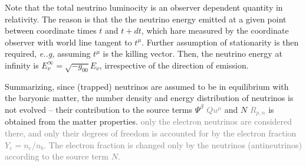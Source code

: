 \documentclass[11pt,a4paper,headinclude=true,DIV=14,BCOR=8mm,chapterprefix,listof=totoc,twoside,openright,abstracton]{scrbook}
\newcommand{\gray}[1]{\textcolor{gray}{#1}}
\begin{document}
Note that the total neutrino luminocity is an observer dependent quantity in relativity. 
The reason is that the the neutrino energy emitted at a given point between coordinate times $t$ and $t+dt$, which hare measured by the coordinate observer with world line tangent to $t^{\mu}$. 
Further assumption of stationarity is then required, \textit{e..g,} assuming $t^{\mu}$ is the killing vector. Then, the neutrino energy at infinity is $E_{\nu}^{\infty} = \sqrt{-g_{00}}E_{\nu}$, irrespective of the direction of emission.

Summarizing, since (trapped) neutrinos are assumed to be in equilibrium with the baryonic matter, the number density and energy distribution of neutrinos is not evolved -- their contribution to the source terms $\Psi^{\beta}$ \gray{$Qu^{\mu}$} and $N$ \gray{$R_{p,n}$} is obtained from the matter properties.
\gray{only the electron neutrinos are considered there, and only their degrees of freedom is accounted for by the electron fraction $Y_e=n_e/n_b$.
    The electron fraction is changed only by the neutrinos (antineutrinos) according to the source term $N$.}
\end{document}

